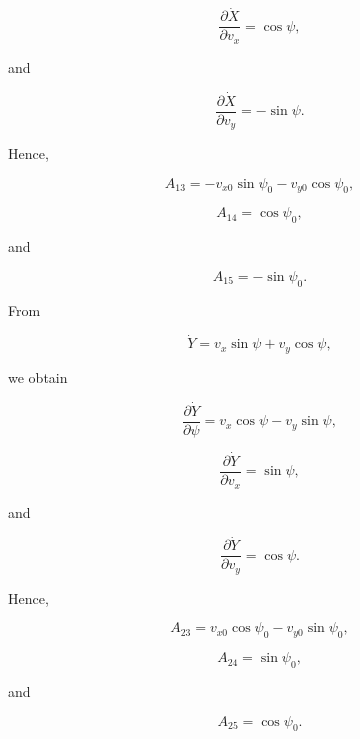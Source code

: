 \documentclass[12pt,a4paper]{article}
\begin{document}
\begin{equation}
\frac{\partial\dot X}{\partial v_x}
=
\cos\psi,
\end{equation}

and

\begin{equation}
\frac{\partial\dot X}{\partial v_y}
=
-\sin\psi.
\end{equation}

Hence,

\begin{equation}
A_{13}
=
-v_{x0}\sin\psi_0
-v_{y0}\cos\psi_0,
\end{equation}

\begin{equation}
A_{14}
=
\cos\psi_0,
\end{equation}

and

\begin{equation}
A_{15}
=
-\sin\psi_0.
\end{equation}

From

\begin{equation}
\dot Y
=
v_x\sin\psi
+
v_y\cos\psi,
\end{equation}

we obtain

\begin{equation}
\frac{\partial\dot Y}{\partial\psi}
=
v_x\cos\psi
-v_y\sin\psi,
\end{equation}

\begin{equation}
\frac{\partial\dot Y}{\partial v_x}
=
\sin\psi,
\end{equation}

and

\begin{equation}
\frac{\partial\dot Y}{\partial v_y}
=
\cos\psi.
\end{equation}

Hence,

\begin{equation}
A_{23}
=
v_{x0}\cos\psi_0
-v_{y0}\sin\psi_0,
\end{equation}

\begin{equation}
A_{24}
=
\sin\psi_0,
\end{equation}

and

\begin{equation}
A_{25}
=
\cos\psi_0.
\end{equation}
\end{document}
